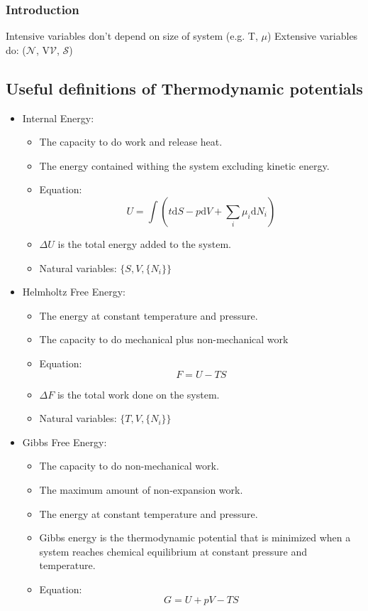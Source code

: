 \documentclass[11pt]{article}
\begin{document}
\subsubsection{Introduction}
\label{sec-3-4-1}
Intensive variables don't depend on size of system (e.g. T, $\mu$)
Extensive variables do: ($\mathcal{N}$, V$\mathcal{V}$, $\mathcal{S}$)
\subsection{Useful definitions of Thermodynamic potentials}
\label{sec-3-5}
\begin{itemize}
\item Internal Energy:
\begin{itemize}
\item The capacity to do work and release heat.
\item The energy contained withing the system excluding kinetic energy.
\item Equation: \[ U = \int ( t\text{d}S -p\text{d}V + \sum_{i}\mu_{i}\text{d}N_{i} ) \]
\item $\Delta U$ is the total energy added to the system.
\item Natural variables: $\{ S, V, \{N_{i}\} \}$
\end{itemize}
\item Helmholtz Free Energy:
\begin{itemize}
\item The energy at constant temperature and pressure.
\item The capacity to do mechanical plus non-mechanical work
\item Equation: \[ F = U - TS \]
\item $\Delta F$ is the total work done on the system.
\item Natural variables: $\{ T, V, \{N_{i}\} \}$
\end{itemize}
\item Gibbs Free Energy:
\begin{itemize}
\item The capacity to do non-mechanical work.
\item The maximum amount of non-expansion work.
\item The energy at constant temperature and pressure.
\item Gibbs energy is the thermodynamic potential that is minimized when a
system reaches chemical equilibrium at constant pressure and
temperature.
\item Equation: \[ G = U + pV - TS  \]

\end{itemize}
\end{itemize}
\end{document}
